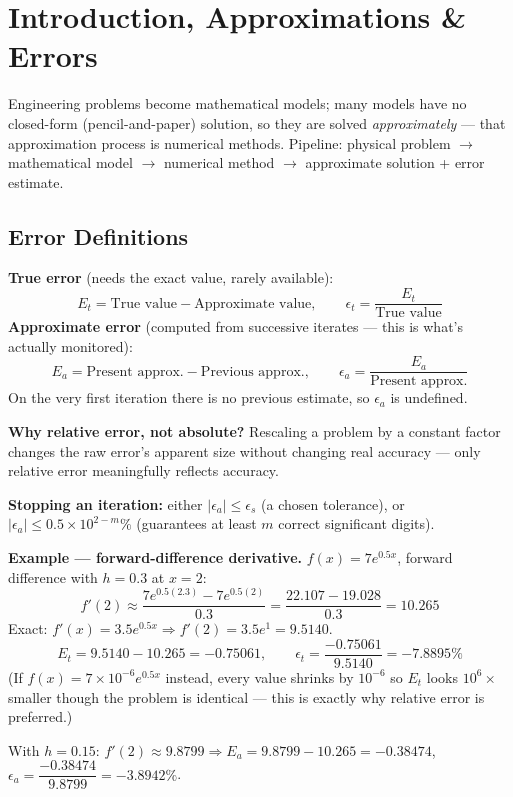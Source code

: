 \section{Introduction, Approximations \& Errors}

\begin{defbox}
Engineering problems become mathematical models; many models have no closed-form (pencil-and-paper) solution, so they are solved \emph{approximately} — that approximation process is numerical methods. Pipeline: physical problem $\to$ mathematical model $\to$ numerical method $\to$ approximate solution + error estimate.
\end{defbox}

\subsection{Error Definitions}

\textbf{True error} (needs the exact value, rarely available):
\[
E_t = \text{True value} - \text{Approximate value}, \qquad \epsilon_t = \frac{E_t}{\text{True value}}
\]
\textbf{Approximate error} (computed from successive iterates — this is what's actually monitored):
\[
E_a = \text{Present approx.} - \text{Previous approx.}, \qquad \epsilon_a = \frac{E_a}{\text{Present approx.}}
\]
On the very first iteration there is no previous estimate, so $\epsilon_a$ is undefined.

\textbf{Why relative error, not absolute?} Rescaling a problem by a constant factor changes the raw error's apparent size without changing real accuracy — only relative error meaningfully reflects accuracy.

\textbf{Stopping an iteration:} either $|\epsilon_a|\le\epsilon_s$ (a chosen tolerance), or $|\epsilon_a|\le 0.5\times10^{2-m}\%$ (guarantees at least $m$ correct significant digits).

\begin{examplebox}
\textbf{Example — forward-difference derivative.} $f(x)=7e^{0.5x}$, forward difference with $h=0.3$ at $x=2$:
\[
f'(2)\approx\frac{7e^{0.5(2.3)}-7e^{0.5(2)}}{0.3} = \frac{22.107-19.028}{0.3}=10.265
\]
Exact: $f'(x)=3.5e^{0.5x}\Rightarrow f'(2)=3.5e^1=9.5140$.
\[
E_t = 9.5140-10.265=-0.75061, \qquad \epsilon_t = \frac{-0.75061}{9.5140}=-7.8895\%
\]
(If $f(x)=7\times10^{-6}e^{0.5x}$ instead, every value shrinks by $10^{-6}$ so $E_t$ looks $10^6\times$ smaller though the problem is identical — this is exactly why relative error is preferred.)

With $h=0.15$: $f'(2)\approx9.8799 \Rightarrow E_a = 9.8799-10.265=-0.38474$, $\epsilon_a=\dfrac{-0.38474}{9.8799}=-3.8942\%$.
\end{examplebox}

